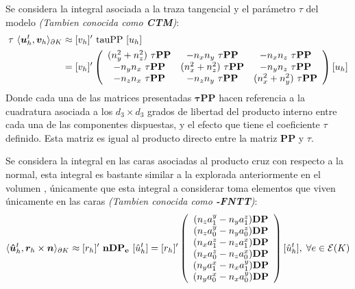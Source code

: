 \documentclass{article}
\begin{document}
\noindent Se considera la integral asociada a la traza tangencial y el parámetro $\tau$ del modelo \textit{(Tambien conocida como \textbf{CTM})}:
\begin{align}
    \begin{split}
    \tau~\langle \boldsymbol{u}_h^t, \boldsymbol{v}_h \rangle_{\partial K} &\approx
    [v_h]'~\mathrm{tauPP}~[u_h] \\ &= 
    [v_h]'
    \left(
    \begin{array}{ccc}
        (n_y^2 + n_z^2)~\mathbf{\tau PP} & -n_x n_y~\mathbf{\tau PP} & -n_x n_z~\mathbf{\tau PP} \\
        -n_y n_x~\mathbf{\tau PP} & (n_x^2 + n_z^2)~\mathbf{\tau PP} & -n_y n_z~\mathbf{\tau PP} \\
        -n_z n_x~\mathbf{\tau PP} & -n_z n_y~\mathbf{\tau PP} & (n_x^2 + n_y^2)~\mathbf{\tau PP} \\
    \end{array}
    \right)
    [u_h]
\end{split}
\end{align}
\noindent Donde cada una de las matrices presentadas $\mathbf{\tau PP}$ hacen referencia a la cuadratura asociada a los $d_3 \times d_3$ grados de libertad del producto interno entre cada una de las componentes dispuestas, y el efecto que tiene el coeficiente $\tau$ definido. Esta matriz es igual al producto directo entre la matriz $\mathbf{PP}$ y $\tau$.

\vspace{1mm}
\noindent Se considera la integral en las caras asociadas al producto cruz con respecto a la normal, esta integral es bastante similar a la explorada anteriormente en el volumen , únicamente que esta integral a considerar toma elementos que viven únicamente en las caras \textit{(Tambien conocida como \textbf{-FNTT})}:
\begin{align*}
    \langle \boldsymbol{\hat{u}}_h^t, \boldsymbol{r}_h \times \boldsymbol{n} \rangle_{\partial K}  \approx
    [r_h]'~\mathbf{nDP_e}~[\hat{u}_h^t]  = 
    [r_h]'
    \left(
    \begin{array}{cccccc}
        (n_z a_{1}^{y}  - n_y a_{1}^{z} ) \mathbf{DP} \\
        (n_z a_{0}^{y}  - n_y a_{0}^{z} ) \mathbf{DP} \\
        (n_x a_{1}^{z}  - n_z a_{1}^{x} ) \mathbf{DP} \\
        (n_x a_{0}^{z}  - n_z a_{0}^{x} ) \mathbf{DP} \\
        (n_y a_{1}^{x}  - n_x a_{1}^{y} ) \mathbf{DP} \\
        (n_y a_{0}^{x}  - n_x a_{0}^{y} ) \mathbf{DP} \\
    \end{array}
    \right)
    [\hat{u}_h^t], \hspace{1mm}
    \forall e \in \mathcal{E}(K)
\end{align*}
\end{document}
